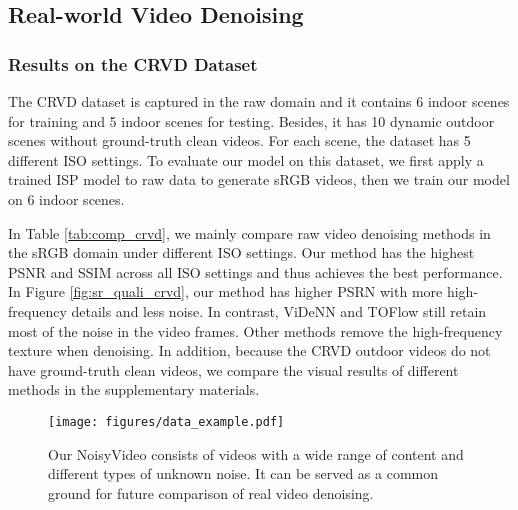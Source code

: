 \documentclass[10pt,twocolumn,letterpaper]{article}
\newlength \g
\begin{document}
\begin{figure*}[t]
{\begin{tabular}{cc}
\end{tabular}
	}
	\vspace{-1mm}
	\caption{Visual comparison and PSNR (dB) of different methods on CRVD indoor dataset \cite{yue2020crvd}.} 
	\vspace{-4mm}
	\label{fig:sr_quali_crvd}
\end{figure*}

\subsection{Real-world Video Denoising}



\vspace{-2mm}
\subsubsection{Results on the CRVD Dataset}
\vspace{-2mm}
The CRVD dataset \cite{yue2020crvd} is captured in the raw domain and it contains 6 indoor scenes for training and 5 indoor scenes for testing. Besides, it has 10 dynamic outdoor scenes without ground-truth clean videos. For each scene, the dataset has 5 different ISO settings. 
To evaluate our model on this dataset, we first apply a trained ISP model to raw data to generate sRGB videos, then we train our model on 6 indoor scenes.

In Table \ref{tab:comp_crvd}, we mainly compare raw video denoising methods in the sRGB domain under different ISO settings.
Our method has the highest PSNR and SSIM across all ISO settings and thus achieves the best performance.
In Figure \ref{fig:sr_quali_crvd}, our method has higher PSRN with more high-frequency details and less noise.
In contrast, ViDeNN \cite{claus2019videnn} and TOFlow \cite{xue2019toflow} still retain most of the noise in the video frames.
Other methods remove the high-frequency texture when denoising.
In addition, because the CRVD outdoor videos do not have ground-truth clean videos, we compare the visual results of different methods in the supplementary materials.


\begin{figure}[t]
  \begin{center}
  \texttt{[image: figures/data\_example.pdf]}
  \end{center}
  \vspace{-3mm}
  \caption{Our NoisyVideo consists of videos with a wide range of content and different types of unknown noise. It can be served as a common ground for future comparison of real video denoising.}
  \label{fig:data_exp}
  \vspace{-3mm}
\end{figure}
\end{document}
